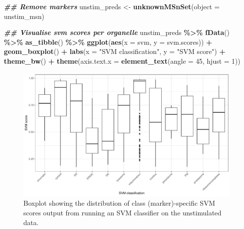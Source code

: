 \documentclass[9pt,a4paper,]{extarticle}
\newenvironment{Shaded}{\begin{snugshade}}{\end{snugshade}}
\newcommand{\AttributeTok}[1]{\textcolor[rgb]{0.13,0.29,0.53}{#1}}
\newcommand{\DecValTok}[1]{\textcolor[rgb]{0.00,0.00,0.81}{#1}}
\newcommand{\DocumentationTok}[1]{\textcolor[rgb]{0.56,0.35,0.01}{\textbf{\textit{#1}}}}
\newcommand{\FunctionTok}[1]{\textcolor[rgb]{0.13,0.29,0.53}{\textbf{#1}}}
\newcommand{\NormalTok}[1]{#1}
\newcommand{\OtherTok}[1]{\textcolor[rgb]{0.56,0.35,0.01}{#1}}
\newcommand{\SpecialCharTok}[1]{\textcolor[rgb]{0.81,0.36,0.00}{\textbf{#1}}}
\newcommand{\StringTok}[1]{\textcolor[rgb]{0.31,0.60,0.02}{#1}}
\begin{document}
\begin{Shaded}
\begin{Highlighting}[]
\DocumentationTok{\#\# Remove markers}
\NormalTok{unstim\_preds }\OtherTok{\textless{}{-}} \FunctionTok{unknownMSnSet}\NormalTok{(}\AttributeTok{object =}\NormalTok{ unstim\_msn)}

\DocumentationTok{\#\# Visualise svm scores per organelle}
\NormalTok{unstim\_preds }\SpecialCharTok{\%\textgreater{}\%}
  \FunctionTok{fData}\NormalTok{() }\SpecialCharTok{\%\textgreater{}\%} 
  \FunctionTok{as\_tibble}\NormalTok{() }\SpecialCharTok{\%\textgreater{}\%}
  \FunctionTok{ggplot}\NormalTok{(}\FunctionTok{aes}\NormalTok{(}\AttributeTok{x =}\NormalTok{ svm, }\AttributeTok{y =}\NormalTok{ svm.scores)) }\SpecialCharTok{+}
  \FunctionTok{geom\_boxplot}\NormalTok{() }\SpecialCharTok{+}
  \FunctionTok{labs}\NormalTok{(}\AttributeTok{x =} \StringTok{"SVM classification"}\NormalTok{, }\AttributeTok{y =} \StringTok{"SVM score"}\NormalTok{) }\SpecialCharTok{+}
  \FunctionTok{theme\_bw}\NormalTok{() }\SpecialCharTok{+} 
  \FunctionTok{theme}\NormalTok{(}\AttributeTok{axis.text.x =} \FunctionTok{element\_text}\NormalTok{(}\AttributeTok{angle =} \DecValTok{45}\NormalTok{, }\AttributeTok{hjust =} \DecValTok{1}\NormalTok{))}
\end{Highlighting}
\end{Shaded}

\begin{figure}[H]

{\centering \includegraphics[width=0.6\linewidth,]{figs/svm_score_boxplot} 

}

\caption{Boxplot showing the distribution of class (marker)-specific SVM scores output from running an SVM classifier on the unstimulated data.}\label{fig:svm-boxplot}
\end{figure}
\end{document}
